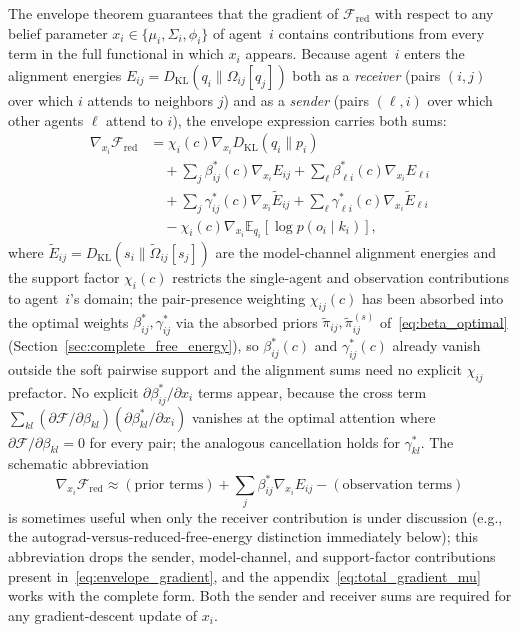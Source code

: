 \documentclass[11pt]{article}
\begin{document}
The envelope theorem guarantees that the gradient of $\mathcal{F}_{\mathrm{red}}$ with respect to any belief parameter $x_i \in \{\mu_i, \Sigma_i, \phi_i\}$ of agent~$i$ contains contributions from every term in the full functional in which $x_i$ appears. Because agent~$i$ enters the alignment energies $E_{ij} = D_{\mathrm{KL}}(q_i \| \Omega_{ij}[q_j])$ both as a \emph{receiver} (pairs $(i,j)$ over which $i$ attends to neighbors $j$) and as a \emph{sender} (pairs $(\ell, i)$ over which other agents $\ell$ attend to $i$), the envelope expression carries both sums:
\begin{equation}
\begin{aligned}
\nabla_{x_i}\mathcal{F}_{\mathrm{red}}
&= \chi_i(c) \nabla_{x_i} D_{\mathrm{KL}}(q_i \| p_i) \\
&\quad + \sum_j \beta_{ij}^*(c) \nabla_{x_i} E_{ij}
       + \sum_\ell \beta_{\ell i}^*(c) \nabla_{x_i} E_{\ell i} \\
&\quad + \sum_j \gamma_{ij}^*(c) \nabla_{x_i} \tilde{E}_{ij}
       + \sum_\ell \gamma_{\ell i}^*(c) \nabla_{x_i} \tilde{E}_{\ell i} \\
&\quad - \chi_i(c) \nabla_{x_i} \mathbb{E}_{q_i}[\log p(o_i \mid k_i)],
\end{aligned}
\label{eq:envelope_gradient}
\end{equation}
where $\tilde{E}_{ij} = D_{\mathrm{KL}}(s_i \| \tilde{\Omega}_{ij}[s_j])$ are the model-channel alignment energies and the support factor $\chi_i(c)$ restricts the single-agent and observation contributions to agent~$i$'s domain; the pair-presence weighting $\chi_{ij}(c)$ has been absorbed into the optimal weights $\beta^*_{ij}, \gamma^*_{ij}$ via the absorbed priors $\tilde{\pi}_{ij}, \tilde{\pi}^{(s)}_{ij}$ of~\eqref{eq:beta_optimal} (Section~\ref{sec:complete_free_energy}), so $\beta^*_{ij}(c)$ and $\gamma^*_{ij}(c)$ already vanish outside the soft pairwise support and the alignment sums need no explicit $\chi_{ij}$ prefactor. No explicit $\partial\beta^*_{ij}/\partial x_i$ terms appear, because the cross term $\sum_{kl}(\partial\mathcal{F}/\partial\beta_{kl})(\partial\beta^*_{kl}/\partial x_i)$ vanishes at the optimal attention where $\partial\mathcal{F}/\partial\beta_{kl} = 0$ for every pair; the analogous cancellation holds for $\gamma^*_{kl}$. The schematic abbreviation
$$\nabla_{x_i}\mathcal{F}_{\mathrm{red}} \approx (\text{prior terms}) + \sum_j \beta_{ij}^* \nabla_{x_i} E_{ij} - (\text{observation terms})$$
is sometimes useful when only the receiver contribution is under discussion (e.g., the autograd-versus-reduced-free-energy distinction immediately below); this abbreviation drops the sender, model-channel, and support-factor contributions present in~\eqref{eq:envelope_gradient}, and the appendix~\eqref{eq:total_gradient_mu} works with the complete form. Both the sender and receiver sums are required for any gradient-descent update of $x_i$.
\end{document}
